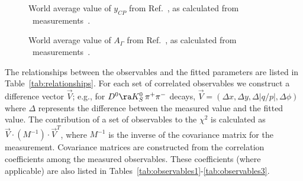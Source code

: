 \begin{figure}
\begin{center}
\end{center}
\vskip-0.20in
\caption{\label{fig:ycp}
World average value of $y^{}_{CP}$ from Ref.~\cite{HFAG_charm:webpage}, 
as calculated from \dkkpp\ 
measurements~\cite{Staric:2007dt,Aitala:1999dt,Link:2000cu,
Csorna:2001ww,Aubert:2007en,Zupanc:2009sy,Aaij:2011ad}.  }
\end{figure}


\begin{figure}
\begin{center}
\end{center}
\vskip-0.20in
\caption{\label{fig:Agamma}
World average value of $A^{}_\Gamma$ from Ref.~\cite{HFAG_charm:webpage}, 
as calculated from \dkkpp\ 
measurements~\cite{Staric:2007dt,Aubert:2007en,Aaij:2011ad}.  }
\end{figure}


The relationships between the observables and the fitted
parameters are listed in Table~\ref{tab:relationships}. 
For each set of correlated observables we construct a
difference vector $\vec{V}$; e.g., for 
$D^0\ra K^0_S\,\pi^+\pi^-$ decays,
$\vec{V}=(\Delta x,\Delta y,\Delta |q/p|,\Delta \phi)$
where $\Delta$ represents the difference between the 
measured value and the fitted value. The 
contribution of a set of observables to the $\chi^2$ 
is calculated as $\vec{V}\cdot (M^{-1})\cdot\vec{V}^T$, 
where $M^{-1}$ is the inverse of the covariance matrix 
for the measurement. Covariance matrices are constructed 
from the correlation coefficients among the measured observables.
These coefficients (where applicable) are also listed in 
Tables~\ref{tab:observables1}-\ref{tab:observables3}. 

